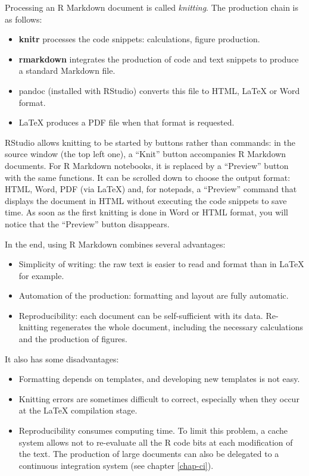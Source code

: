 \documentclass[
  12pt,
  american,
  a4paper,
  extrafontsizes,onecolumn,openright
  ]{memoir}
\providecommand{\tightlist}{%
  \setlength{\itemsep}{0pt}\setlength{\parskip}{0pt}}
\begin{document}
Processing an R Markdown document is called \emph{knitting}.
The production chain is as follows:

\begin{itemize}
\tightlist
\item
  \textbf{knitr} processes the code snippets: calculations, figure production.
\item
  \textbf{rmarkdown} integrates the production of code and text snippets to produce a standard Markdown file.
\item
  pandoc (installed with RStudio) converts this file to HTML, LaTeX or Word format.
\item
  LaTeX produces a PDF file when that format is requested.
\end{itemize}

RStudio allows knitting to be started by buttons rather than commands: in the source window (the top left one), a \enquote{Knit} button accompanies R Markdown documents.
For R Markdown notebooks, it is replaced by a \enquote{Preview} button with the same functions.
It can be scrolled down to choose the output format: HTML, Word, PDF (via LaTeX) and, for notepads, a \enquote{Preview} command that displays the document in HTML without executing the code snippets to save time.
As soon as the first knitting is done in Word or HTML format, you will notice that the \enquote{Preview} button disappears.

In the end, using R Markdown combines several advantages:

\begin{itemize}
\tightlist
\item
  Simplicity of writing: the raw text is easier to read and format than in LaTeX for example.
\item
  Automation of the production: formatting and layout are fully automatic.
\item
  Reproducibility: each document can be self-sufficient with its data. Re-knitting regenerates the whole document, including the necessary calculations and the production of figures.
\end{itemize}

It also has some disadvantages:

\begin{itemize}
\tightlist
\item
  Formatting depends on templates, and developing new templates is not easy.
\item
  Knitting errors are sometimes difficult to correct, especially when they occur at the LaTeX compilation stage.
\item
  Reproducibility consumes computing time.
  To limit this problem, a cache system allows not to re-evaluate all the R code bits at each modification of the text.
  The production of large documents can also be delegated to a continuous integration system (see chapter \ref{chap-ci}).
\end{itemize}
\end{document}

